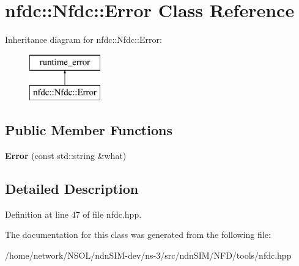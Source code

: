 \hypertarget{classnfdc_1_1Nfdc_1_1Error}{}\section{nfdc\+:\+:Nfdc\+:\+:Error Class Reference}
\label{classnfdc_1_1Nfdc_1_1Error}
Inheritance diagram for nfdc\+:\+:Nfdc\+:\+:Error\+:\begin{figure}[H]
\begin{center}
\leavevmode
\includegraphics[height=2.000000cm]{classnfdc_1_1Nfdc_1_1Error}
\end{center}
\end{figure}
\subsection*{Public Member Functions}
\begin{DoxyCompactItemize}
\item 
{\bfseries Error} (const std\+::string \&what)\hypertarget{classnfdc_1_1Nfdc_1_1Error_ae36212d0752944801dd5cbbc1cf5ecff}{}\label{classnfdc_1_1Nfdc_1_1Error_ae36212d0752944801dd5cbbc1cf5ecff}

\end{DoxyCompactItemize}


\subsection{Detailed Description}


Definition at line 47 of file nfdc.\+hpp.



The documentation for this class was generated from the following file\+:\begin{DoxyCompactItemize}
\item 
/home/network/\+N\+S\+O\+L/ndn\+S\+I\+M-\/dev/ns-\/3/src/ndn\+S\+I\+M/\+N\+F\+D/tools/nfdc.\+hpp\end{DoxyCompactItemize}
